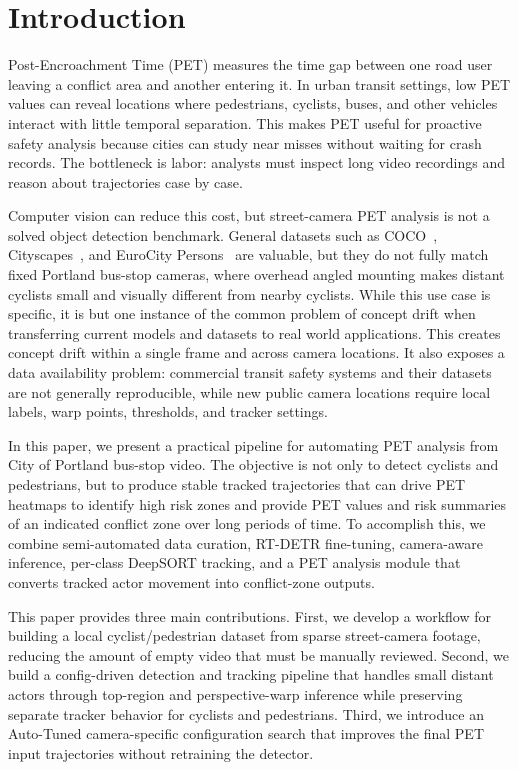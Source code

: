 \documentclass[conference]{IEEEtran}
\begin{document}
\section{Introduction}

Post-Encroachment Time (PET) measures the time gap between one road user leaving a conflict area and another entering it. In urban transit settings, low PET values can reveal locations where pedestrians, cyclists, buses, and other vehicles interact with little temporal separation. This makes PET useful for proactive safety analysis because cities can study near misses without waiting for crash records. The bottleneck is labor: analysts must inspect long video recordings and reason about trajectories case by case.

Computer vision can reduce this cost, but street-camera PET analysis is not a solved object detection benchmark. General datasets such as COCO~\cite{lin2014microsoft}, Cityscapes~\cite{cordts2016cityscapes}, and EuroCity Persons~\cite{braun2019eurocity} are valuable, but they do not fully match fixed Portland bus-stop cameras, where overhead angled mounting makes distant cyclists small and visually different from nearby cyclists. While this use case is specific, it is but one instance of the common problem of concept drift when transferring current models and datasets to real world applications. This creates concept drift within a single frame and across camera locations. It also exposes a data availability problem: commercial transit safety systems and their datasets are not generally reproducible, while new public camera locations require local labels, warp points, thresholds, and tracker settings.

In this paper, we present a practical pipeline for automating PET analysis from City of Portland bus-stop video. The objective is not only to detect cyclists and pedestrians, but to produce stable tracked trajectories that can drive PET heatmaps to identify high risk zones and provide PET values and risk summaries of an indicated conflict zone over long periods of time. To accomplish this, we combine semi-automated data curation, RT-DETR fine-tuning, camera-aware inference, per-class DeepSORT tracking, and a PET analysis module that converts tracked actor movement into conflict-zone outputs.

This paper provides three main contributions. First, we develop a workflow for building a local cyclist/pedestrian dataset from sparse street-camera footage, reducing the amount of empty video that must be manually reviewed. Second, we build a config-driven detection and tracking pipeline that handles small distant actors through top-region and perspective-warp inference while preserving separate tracker behavior for cyclists and pedestrians. Third, we introduce an Auto-Tuned camera-specific configuration search that improves the final PET input trajectories without retraining the detector.
\end{document}

